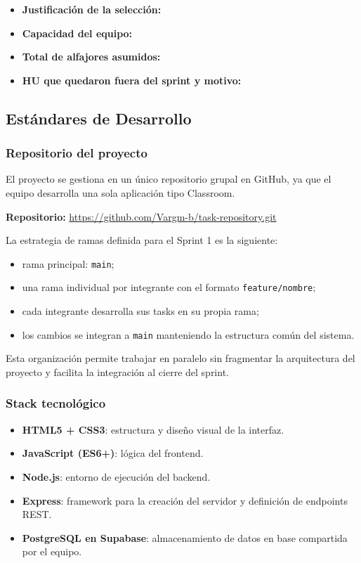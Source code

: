 \documentclass[12pt,a4paper]{article}
\begin{document}
\begin{itemize}
    \item \textbf{Justificación de la selección:} %
    \item \textbf{Capacidad del equipo:} %
    \item \textbf{Total de alfajores asumidos:} %
    \item \textbf{HU que quedaron fuera del sprint y motivo:} %
\end{itemize}

\subsection{Estándares de Desarrollo}

\subsubsection*{Repositorio del proyecto}

El proyecto se gestiona en un único repositorio grupal en GitHub, ya que el equipo desarrolla una sola aplicación tipo Classroom.

\textbf{Repositorio:} \url{https://github.com/Vargm-b/task-repository.git}

La estrategia de ramas definida para el Sprint 1 es la siguiente:

\begin{itemize}
    \item rama principal: \texttt{main};
    \item una rama individual por integrante con el formato \texttt{feature/nombre};
    \item cada integrante desarrolla sus tasks en su propia rama;
    \item los cambios se integran a \texttt{main} manteniendo la estructura común del sistema.
\end{itemize}

Esta organización permite trabajar en paralelo sin fragmentar la arquitectura del proyecto y facilita la integración al cierre del sprint.

\subsubsection*{Stack tecnológico}

\begin{itemize}
    \item \textbf{HTML5 + CSS3}: estructura y diseño visual de la interfaz.
    \item \textbf{JavaScript (ES6+)}: lógica del frontend.
    \item \textbf{Node.js}: entorno de ejecución del backend.
    \item \textbf{Express}: framework para la creación del servidor y definición de endpoints REST.
    \item \textbf{PostgreSQL en Supabase}: almacenamiento de datos en base compartida por el equipo.
\end{itemize}
\end{document}
